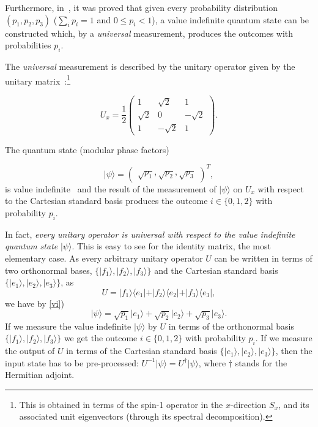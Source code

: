\documentclass[%
 superscriptaddress,
  preprint,
 showpacs,
 showkeys,
 nofootinbib,
  amsmath,amssymb,
 pra,
  longbibliography,
  floatfix,
 ]{revtex4-2}
\theoremstyle{definition}
\begin{document}
Furthermore, in~\cite{RSPA23}, it was proved that
 given every probability distribution $(p_1,p_2,p_3)$ ($\sum_{i}p_i=1$ and $0\le  p_i < 1$), a value indefinite quantum state can be constructed which, by a {\it universal} measurement, produces the
outcomes with probabilities $p_i$.



 The {\it universal} measurement is described
by the unitary operator given by the unitary matrix~\cite{RSPA23}:\footnote{This is obtained in terms of the spin-1 operator in the $x$-direction $S_x$, and its associated unit eigenvectors (through its spectral decomposition).}

\begin{equation}
U_x =\frac{1}{2}
\begin{pmatrix}
1 & \sqrt{2} & 1\\
\sqrt{2} & 0 & -\sqrt{2}\\
1 & -\sqrt{2} & 1
\end{pmatrix}.
\label{2023-ux}
\end{equation}


\noindent The quantum state
(modular phase factors)

\begin{equation}
\label{vi}
\vert \psi \rangle=\begin{pmatrix}\sqrt{p_1},\sqrt{p_2},\sqrt{p_3}\end{pmatrix}^T,
\end{equation}
is value indefinite~\cite[Theorem 4.1.]{RSPA23} and the result of the measurement of $\vert \psi \rangle$ on $U_x$ with respect to the Cartesian standard basis produces the outcome
 $i\in \{0,1,2\}$ with probability $p_i$.

In fact, {\it every unitary operator is universal with respect to the value indefinite quantum state} $\vert \psi \rangle$. This is easy to see for
the identity matrix, the most elementary case. %
As every arbitrary unitary operator $U$  can be written in terms of two orthonormal bases,
$\{ \vert f_1 \rangle, \vert f_2 \rangle , \vert f_3 \rangle  \}$
and the  Cartesian standard basis $\{ \vert e_1 \rangle, \vert e_2 \rangle , \vert e_3 \rangle  \}$,
as
$$U=
\vert f_1\rangle \langle e_1\vert +
\vert f_2\rangle \langle e_2\vert +
\vert f_3\rangle \langle e_3\vert ,$$
 we have by {\ref{vi})
\begin{equation}
\vert \psi \rangle =
\sqrt{p_1}\vert e_1 \rangle + \sqrt{p_2}\vert e_2 \rangle + \sqrt{p_3}\vert e_3 \rangle.
\end{equation}
If we measure the value indefinite $\vert \psi \rangle$ by $U$
in terms of the orthonormal basis
$\{ \vert f_1 \rangle, \vert f_2 \rangle , \vert f_3 \rangle  \}$
}
we get the outcome
 $i\in \{0,1,2\}$ with probability $p_i$.
 If we  measure the output of $U$ in terms of the
Cartesian standard basis $\{ \vert e_1 \rangle, \vert e_2 \rangle , \vert e_3 \rangle  \}$, then the input state has to be pre-processed: %
$U^{-1}\vert \psi \rangle = U^\dagger \vert \psi \rangle$, where $\dagger$ stands for the  Hermitian adjoint.
\end{document}

